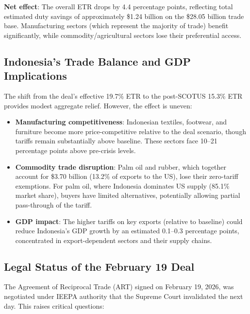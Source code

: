 \documentclass[12pt,a4paper]{article}
\begin{document}
\textbf{Net effect}: The overall ETR drops by 4.4 percentage points, reflecting total estimated duty savings of approximately \$1.24 billion on the \$28.05 billion trade base. Manufacturing sectors (which represent the majority of trade) benefit significantly, while commodity/agricultural sectors lose their preferential access.

\subsection{Indonesia's Trade Balance and GDP Implications}

The shift from the deal's effective 19.7\% ETR to the post-SCOTUS 15.3\% ETR provides modest aggregate relief. However, the effect is uneven:

\begin{itemize}
    \item \textbf{Manufacturing competitiveness}: Indonesian textiles, footwear, and furniture become more price-competitive relative to the deal scenario, though tariffs remain substantially above baseline. These sectors face 10--21 percentage points above pre-crisis levels.

    \item \textbf{Commodity trade disruption}: Palm oil and rubber, which together account for \$3.70 billion (13.2\% of exports to the US), lose their zero-tariff exemptions. For palm oil, where Indonesia dominates US supply (85.1\% market share), buyers have limited alternatives, potentially allowing partial pass-through of the tariff.

    \item \textbf{GDP impact}: The higher tariffs on key exports (relative to baseline) could reduce Indonesia's GDP growth by an estimated 0.1--0.3 percentage points, concentrated in export-dependent sectors and their supply chains.
\end{itemize}

\subsection{Legal Status of the February 19 Deal}

The Agreement of Reciprocal Trade (ART) signed on February 19, 2026, was negotiated under IEEPA authority that the Supreme Court invalidated the next day. This raises critical questions:
\end{document}
